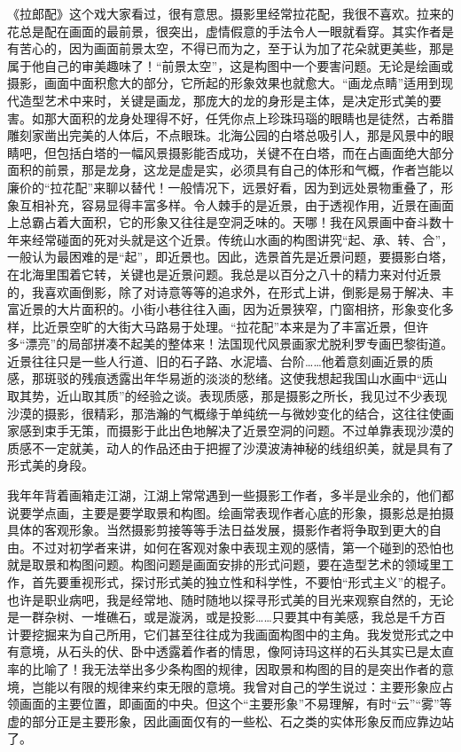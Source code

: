 \documentclass{article}
\begin{document}
《拉郎配》这个戏大家看过，很有意思。摄影里经常拉花配，我很不喜欢。拉来的花总是配在画面的最前景，很突出，虚情假意的手法令人一眼就看穿。其实作者是有苦心的，因为画面前景太空，不得已而为之，至于认为加了花朵就更美些，那是属于他自己的审美趣味了！“前景太空”，这是构图中一个要害问题。无论是绘画或摄影，画面中面积愈大的部分，它所起的形象效果也就愈大。“画龙点睛”适用到现代造型艺术中来时，关键是画龙，那庞大的龙的身形是主体，是决定形式美的要害。如那大面积的龙身处理得不好，任凭你点上珍珠玛瑙的眼睛也是徒然，古希腊雕刻家凿出完美的人体后，不点眼珠。北海公园的白塔总吸引人，那是风景中的眼睛吧，但包括白塔的一幅风景摄影能否成功，关键不在白塔，而在占画面绝大部分面积的前景，那是龙身，这龙是虚是实，必须具有自己的体形和气概，作者岂能以廉价的“拉花配”来聊以替代！一般情况下，远景好看，因为到远处景物重叠了，形象互相补充，容易显得丰富多样。令人棘手的是近景，由于透视作用，近景在画面上总霸占着大面积，它的形象又往往是空洞乏味的。天哪！我在风景画中奋斗数十年来经常碰面的死对头就是这个近景。传统山水画的构图讲究“起、承、转、合”，一般认为最困难的是“起”，即近景也。因此，选景首先是近景问题，要摄影白塔，在北海里围着它转，关键也是近景问题。我总是以百分之八十的精力来对付近景的，我喜欢画倒影，除了对诗意等等的追求外，在形式上讲，倒影是易于解决、丰富近景的大片面积的。小街小巷往往入画，因为近景狭窄，门窗相挤，形象变化多样，比近景空旷的大街大马路易于处理。“拉花配”本来是为了丰富近景，但许多“漂亮”的局部拼凑不起美的整体来！法国现代风景画家尤脱利罗专画巴黎街道。近景往往只是一些人行道、旧的石子路、水泥墙、台阶……他着意刻画近景的质感，那斑驳的残痕透露出年华易逝的淡淡的愁绪。这使我想起我国山水画中“远山取其势，近山取其质”的经验之谈。表现质感，那是摄影之所长，我见过不少表现沙漠的摄影，很精彩，那浩瀚的气概缘于单纯统一与微妙变化的结合，这往往使画家感到束手无策，而摄影于此出色地解决了近景空洞的问题。不过单靠表现沙漠的质感不一定就美，动人的作品还由于把握了沙漠波涛神秘的线组织美，就是具有了形式美的身段。

我年年背着画箱走江湖，江湖上常常遇到一些摄影工作者，多半是业余的，他们都说要学点画，主要是要学取景和构图。绘画常表现作者心底的形象，摄影总是拍摄具体的客观形象。当然摄影剪接等等手法日益发展，摄影作者将争取到更大的自由。不过对初学者来讲，如何在客观对象中表现主观的感情，第一个碰到的恐怕也就是取景和构图问题。构图问题是画面安排的形式问题，要在造型艺术的领域里工作，首先要重视形式，探讨形式美的独立性和科学性，不要怕“形式主义”的棍子。也许是职业病吧，我是经常地、随时随地以探寻形式美的目光来观察自然的，无论是一群杂树、一堆礁石，或是漩涡，或是投影……只要其中有美感，我总是千方百计要挖掘来为自己所用，它们甚至往往成为我画面构图中的主角。我发觉形式之中有意境，从石头的伏、卧中透露着作者的情思，像阿诗玛这样的石头其实已是太直率的比喻了！我无法举出多少条构图的规律，因取景和构图的目的是突出作者的意境，岂能以有限的规律来约束无限的意境。我曾对自己的学生说过：主要形象应占领画面的主要位置，即画面的中央。但这个“主要形象”不易理解，有时“云”“雾”等虚的部分正是主要形象，因此画面仅有的一些松、石之类的实体形象反而应靠边站了。
\end{document}
